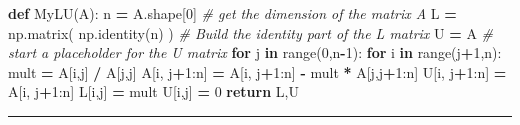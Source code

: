 \documentclass[
]{book}
\newenvironment{Shaded}{\begin{snugshade}}{\end{snugshade}}
\newcommand{\BuiltInTok}[1]{#1}
\newcommand{\CommentTok}[1]{\textcolor[rgb]{0.56,0.35,0.01}{\textit{#1}}}
\newcommand{\ControlFlowTok}[1]{\textcolor[rgb]{0.13,0.29,0.53}{\textbf{#1}}}
\newcommand{\DecValTok}[1]{\textcolor[rgb]{0.00,0.00,0.81}{#1}}
\newcommand{\KeywordTok}[1]{\textcolor[rgb]{0.13,0.29,0.53}{\textbf{#1}}}
\newcommand{\NormalTok}[1]{#1}
\newcommand{\OperatorTok}[1]{\textcolor[rgb]{0.81,0.36,0.00}{\textbf{#1}}}
\theoremstyle{definition}
\theoremstyle{definition}
\theoremstyle{definition}
\theoremstyle{remark}
\begin{document}
\begin{Shaded}
\begin{Highlighting}[]
\KeywordTok{def}\NormalTok{ MyLU(A):}
\NormalTok{    n }\OperatorTok{=}\NormalTok{ A.shape[}\DecValTok{0}\NormalTok{] }\CommentTok{\# get the dimension of the matrix A}
\NormalTok{    L }\OperatorTok{=}\NormalTok{ np.matrix( np.identity(n) ) }\CommentTok{\# Build the identity part of the L matrix}
\NormalTok{    U }\OperatorTok{=}\NormalTok{ A }\CommentTok{\# start a placeholder for the U matrix}
    \ControlFlowTok{for}\NormalTok{ j }\KeywordTok{in} \BuiltInTok{range}\NormalTok{(}\DecValTok{0}\NormalTok{,n}\OperatorTok{{-}}\DecValTok{1}\NormalTok{):}
        \ControlFlowTok{for}\NormalTok{ i }\KeywordTok{in} \BuiltInTok{range}\NormalTok{(j}\OperatorTok{+}\DecValTok{1}\NormalTok{,n):}
\NormalTok{            mult }\OperatorTok{=}\NormalTok{ A[i,j] }\OperatorTok{/}\NormalTok{ A[j,j]}
\NormalTok{            A[i, j}\OperatorTok{+}\DecValTok{1}\NormalTok{:n] }\OperatorTok{=}\NormalTok{ A[i, j}\OperatorTok{+}\DecValTok{1}\NormalTok{:n] }\OperatorTok{{-}}\NormalTok{ mult }\OperatorTok{*}\NormalTok{ A[j,j}\OperatorTok{+}\DecValTok{1}\NormalTok{:n]}
\NormalTok{            U[i, j}\OperatorTok{+}\DecValTok{1}\NormalTok{:n] }\OperatorTok{=}\NormalTok{ A[i, j}\OperatorTok{+}\DecValTok{1}\NormalTok{:n]}
\NormalTok{            L[i,j] }\OperatorTok{=}\NormalTok{ mult}
\NormalTok{            U[i,j] }\OperatorTok{=} \DecValTok{0}
    \ControlFlowTok{return}\NormalTok{ L,U}
\end{Highlighting}
\end{Shaded}

\begin{center}\rule{0.5\linewidth}{0.5pt}\end{center}
\end{document}
